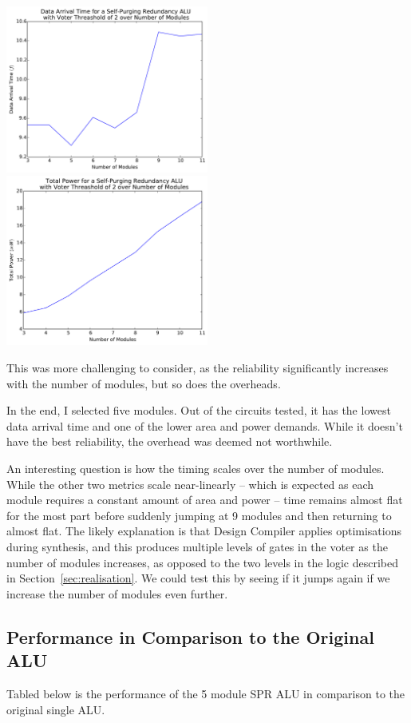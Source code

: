 \documentclass[a4paper,12pt]{article}
\begin{document}
    \includegraphics[width=0.5\textwidth]{time}
    \includegraphics[width=0.5\textwidth]{power}

    This was more challenging to consider, as the reliability significantly increases with the number of modules, but so does the overheads.

    In the end, I selected five modules. Out of the circuits tested, it has the lowest data arrival time and one of the lower area and power demands. While it doesn't have the best reliability, the overhead was deemed not worthwhile.

    An interesting question is how the timing scales over the number of modules. While the other two metrics scale near-linearly -- which is expected as each module requires a constant amount of area and power -- time remains almost flat for the most part before suddenly jumping at 9 modules and then returning to almost flat. The likely explanation is that Design Compiler applies optimisations during synthesis, and this produces multiple levels of gates in the voter as the number of modules increases, as opposed to the two levels in the logic described in Section~\ref{sec:realisation}. We could test this by seeing if it jumps again if we increase the number of modules even further.

    \subsection{Performance in Comparison to the Original ALU}
    Tabled below is the performance of the 5 module SPR ALU in comparison to the original single ALU.
\end{document}
